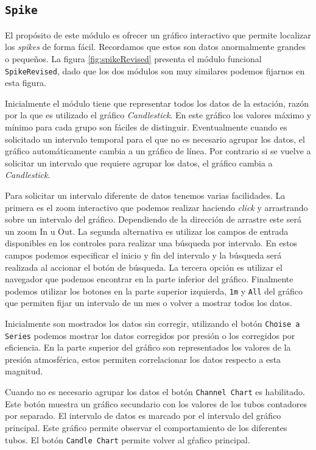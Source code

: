 	\subsection{\texttt{Spike}}
		El propósito de este módulo es ofrecer un gráfico interactivo que permite localizar los \emph{spikes} de forma fácil. Recordamos
		que estos son datos anormalmente grandes o pequeños. La figura \ref{fig:spikeRevised} presenta el módulo funcional
		\texttt{SpikeRevised}, dado que los dos módulos son muy similares podemos fijarnos en esta figura.
		\par
		Inicialmente el módulo tiene que representar todos los datos de la estación, razón por la que es utilizado el gráfico
		\emph{Candlestick}. En este gráfico los valores máximo y mínimo para cada grupo son fáciles de distinguir. Eventualmente cuando es
		solicitado un intervalo temporal para el que no es necesario agrupar los datos, el gráfico automáticamente cambia a un gráfico de
		línea. Por contrario si se vuelve a solicitar un intervalo que requiere agrupar los datos, el gráfico cambia a \emph{Candlestick}.
		\par
		Para solicitar un intervalo diferente de datos tenemos varias facilidades. La primera es el zoom interactivo que podemos realizar
		haciendo \emph{click} y arrastrando sobre un intervalo del gráfico. Dependiendo de la dirección de arrastre este será un zoom In u
		Out. La segunda alternativa es utilizar los campos de entrada disponibles en los controles para realizar una búsqueda por intervalo.
		En estos campos podemos especificar el inicio y fin del intervalo y la búsqueda será realizada al accionar el botón de búsqueda. La
		tercera opción es utilizar el navegador que podemos encontrar en la parte inferior del gráfico. Finalmente podemos utilizar los
		botones en la parte superior izquierda, \texttt{1m} y \texttt{All} del gráfico que permiten fijar un intervalo de un mes o volver
		a mostrar todos los datos.
		\par
		Inicialmente son mostrados los datos sin corregir, utilizando el botón \texttt{Choise a Series} podemos mostrar los datos corregidos
		por presión o los corregidos por eficiencia. En la parte superior del gráfico son representados los valores de la presión atmosférica,
		estos permiten correlacionar los datos respecto a esta magnitud.
		\par
		Cuando no es necesario agrupar los datos el botón \texttt{Channel Chart} es habilitado. Este botón muestra un gráfico secundario con
		los valores de los tubos contadores por separado. El intervalo de datos es marcado por el intervalo del gráfico principal. Este
		gráfico permite observar el comportamiento de los diferentes tubos. El botón \texttt{Candle Chart} permite volver al gŕafico
		principal.
